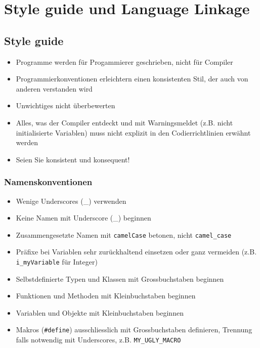 \section{Style guide und Language Linkage}
\subsection{Style guide}
\begin{itemize}
	\item Programme werden für Progammierer geschrieben, nicht für Compiler
	\item Programmierkonventionen erleichtern einen konsistenten Stil, der auch von anderen verstanden wird
	\item Unwichtiges nicht überbewerten
	\item Alles, was der Compiler entdeckt und mit Warningsmeldet (z.B. nicht initialisierte Variablen) muss nicht explizit in den Codierrichtlinien erwähnt werden
	\item Seien Sie konsistent und konsequent!
\end{itemize}

\subsubsection{Namenskonventionen}
\begin{itemize}
	\item Wenige Underscores (\_) verwenden
	\item Keine Namen mit Underscore (\_) beginnen
	\item Zusammengesetzte Namen mit \lstinline{camelCase} betonen, nicht \lstinline{camel_case}
	\item Präfixe bei Variablen sehr zurückhaltend einsetzen oder ganz vermeiden (z.B. \lstinline{i_myVariable} für Integer)
	\item Selbstdefinierte Typen und Klassen mit Grossbuchstaben beginnen
	\item Funktionen und Methoden mit Kleinbuchstaben beginnen
	\item Variablen und Objekte mit Kleinbuchstaben beginnen
	\item Makros (\lstinline{#define}) ausschliesslich mit Grossbuchstaben definieren, Trennung falls notwendig mit Underscores, z.B. \lstinline{MY_UGLY_MACRO}
\end{itemize}

